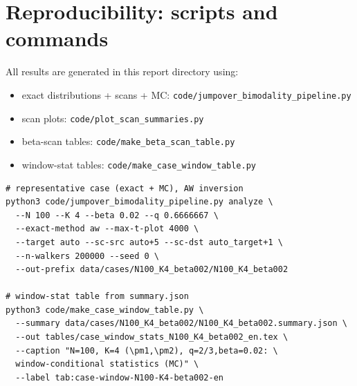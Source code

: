 \documentclass[11pt]{article}
\begin{document}
\section{Reproducibility: scripts and commands}
All results are generated in this report directory using:
\begin{itemize}
  \item exact distributions + scans + MC: \texttt{code/jumpover\_bimodality\_pipeline.py}
  \item scan plots: \texttt{code/plot\_scan\_summaries.py}
  \item beta-scan tables: \texttt{code/make\_beta\_scan\_table.py}
  \item window-stat tables: \texttt{code/make\_case\_window\_table.py}
\end{itemize}

\begin{verbatim}
# representative case (exact + MC), AW inversion
python3 code/jumpover_bimodality_pipeline.py analyze \
  --N 100 --K 4 --beta 0.02 --q 0.6666667 \
  --exact-method aw --max-t-plot 4000 \
  --target auto --sc-src auto+5 --sc-dst auto_target+1 \
  --n-walkers 200000 --seed 0 \
  --out-prefix data/cases/N100_K4_beta002/N100_K4_beta002

# window-stat table from summary.json
python3 code/make_case_window_table.py \
  --summary data/cases/N100_K4_beta002/N100_K4_beta002.summary.json \
  --out tables/case_window_stats_N100_K4_beta002_en.tex \
  --caption "N=100, K=4 (\pm1,\pm2), q=2/3,beta=0.02: \
  window-conditional statistics (MC)" \
  --label tab:case-window-N100-K4-beta002-en
\end{verbatim}
\end{document}
